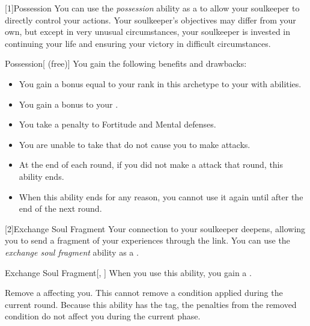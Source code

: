         [1]{Possession} You can use the \textit{possession} ability as a  to allow your soulkeeper to directly control your actions.
        Your soulkeeper's objectives may differ from your own, but except in very unusual circumstances, your soulkeeper is invested in continuing your life and ensuring your victory in difficult circumstances.
        \begin{attuneability}{Possession}[ (free)]
            You gain the following benefits and drawbacks:
            \begin{itemize}
                \item You gain a bonus equal to your rank in this archetype to your  with  abilities.
                \item You gain a  bonus to your .
                \item You take a  penalty to Fortitude and Mental defenses.
                \item You are unable to take  that do not cause you to make  attacks.
                \item At the end of each round, if you did not make a  attack that round, this ability ends.
                \item When this ability ends for any reason, you cannot use it again until after the end of the next round.
            \end{itemize}
        \end{attuneability}

        [2]{Exchange Soul Fragment} Your connection to your soulkeeper deepens, allowing you to send a fragment of your experiences through the link.
        You can use the \textit{exchange soul fragment} ability as a .
        \begin{freeability}{Exchange Soul Fragment}[, ]
            When you use this ability, you gain a .

            Remove a  affecting you.
            This cannot remove a condition applied during the current round.
            Because this ability has the  tag, the penalties from the removed condition do not affect you during the current phase.
        \end{freeability}

